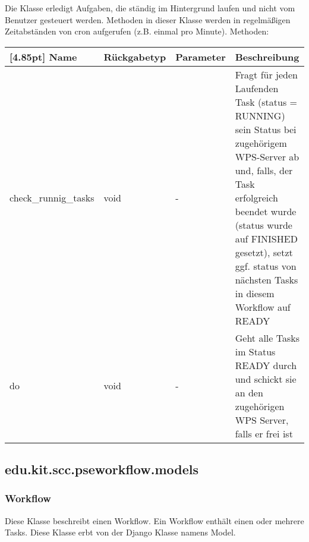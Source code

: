         Die Klasse erledigt Aufgaben, die ständig im Hintergrund laufen und nicht vom Benutzer gesteuert werden. Methoden in dieser Klasse werden in regelmäßigen Zeitabständen von cron aufgerufen (z.B. einmal pro Minute).
        \newline\newline
        Methoden:
        \begin{center}
        	\setlength\tabcolsep{5pt}
        	\renewcommand{\arraystretch}{1.5}
        	
        	\begin{tabularx}{\textwidth}{|l|l|l|X|}
        		\hline
        		\rowcolor[gray]{0.90}[4.85pt]
        		Name & Rückgabetyp & Parameter & Beschreibung \\ \hline
        		check_runnig_tasks & void & - & Fragt für jeden Laufenden Task (status = RUNNING) sein Status bei zugehörigem WPS-Server ab und, falls, der Task erfolgreich beendet wurde (status wurde auf FINISHED gesetzt), setzt ggf. status von nächsten Tasks in diesem Workflow auf READY \\ \hline
        		do & void & - & Geht alle Tasks im Status READY durch und schickt sie an den zugehörigen WPS Server, falls er frei ist \\ \hline
        	\end{tabularx}
        \end{center}


    

        \subsection{edu.kit.scc.pseworkflow.models}
            \subsubsection{Workflow}
	        Diese Klasse beschreibt einen Workflow. Ein Workflow enthält einen oder mehrere Tasks. \newline
	        Diese Klasse erbt von der Django Klasse namens \glqq Model\grqq .
                    
